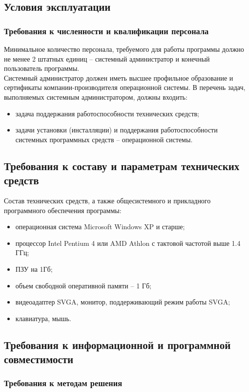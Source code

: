 \documentclass[14pt, a4paper]{extarticle}
\begin{document}
	\subsection{Условия эксплуатации}
	\subsubsection{Требования к численности и квалификации персонала}
	Минимальное количество персонала, требуемого для работы программы должно не менее 2 штатных единиц – системный администратор и конечный пользователь программы.\\
	Системный администратор должен иметь высшее профильное образование и сертификаты компании-производителя операционной системы. В перечень задач, выполняемых системным администратором, должны входить:
	\begin{itemize}
		\item задача поддержания работоспособности технических средств;
		\item задачи установки (инсталляции) и поддержания работоспособности системных программных средств – операционной системы.
	\end{itemize}

	\subsection{Требования к составу и параметрам технических средств}
	Состав технических средств, а также общесистемного и прикладного программного обеспечения программы:
	\begin{itemize}
		\item операционная система Microsoft Windows XP и старше;
		\item процессор Intel Pentium 4 или AMD Athlon с тактовой частотой выше 1.4 ГГц;
		\item ПЗУ на 1Гб;
		\item объем свободной оперативной памяти – 1 Гб;
		\item видеоадаптер SVGA, монитор, поддерживающий режим работы SVGA;
		\item клавиатура, мышь.
	\end{itemize}

	\subsection{Требования к информационной и программной совместимости}
	\subsubsection{Требования к методам решения}
	
\end{document}
